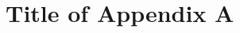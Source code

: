 \documentclass[10pt, conference, compsocconf]{IEEEtran}
\begin{document}
%






\newpage
\appendix
\section{\\Title of Appendix A} \label{App:AppendixA}



\end{document}
